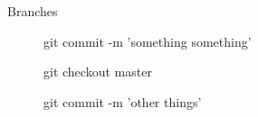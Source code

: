 \begin{frame}{Branches}
	\framebreak
	\begin{figure}
		\centering
		\caption{git commit -m 'something something'}
	\end{figure}

	\framebreak
	\begin{figure}
		\centering
		\caption{git checkout master}
	\end{figure}

	\framebreak
	\begin{figure}
		\centering
		\caption{git commit -m 'other things'}
	\end{figure}
	\framebreak
	

\end{frame}
